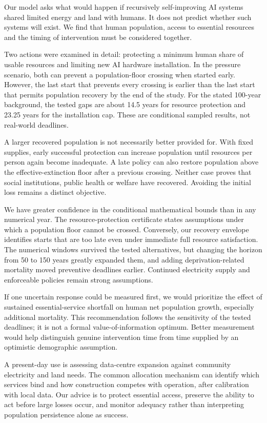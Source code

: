 \documentclass[12pt,a4paper]{article}
\theoremstyle{remark}
\begin{document}
Our model asks what would happen if recursively self-improving AI systems shared limited energy and land with humans. It does not predict whether such systems will exist. We find that human population, access to essential resources and the timing of intervention must be considered together.

Two actions were examined in detail: protecting a minimum human share of usable resources and limiting new AI hardware installation. In the pressure scenario, both can prevent a population-floor crossing when started early. However, the last start that prevents every crossing is earlier than the last start that permits population recovery by the end of the study. For the stated 100-year background, the tested gaps are about 14.5 years for resource protection and 23.25 years for the installation cap. These are conditional sampled results, not real-world deadlines.

A larger recovered population is not necessarily better provided for. With fixed supplies, early successful protection can increase population until resources per person again become inadequate. A late policy can also restore population above the effective-extinction floor after a previous crossing. Neither case proves that social institutions, public health or welfare have recovered. Avoiding the initial loss remains a distinct objective.

We have greater confidence in the conditional mathematical bounds than in any numerical year. The resource-protection certificate states assumptions under which a population floor cannot be crossed. Conversely, our recovery envelope identifies starts that are too late even under immediate full resource satisfaction. The numerical windows survived the tested alternatives, but changing the horizon from 50 to 150 years greatly expanded them, and adding deprivation-related mortality moved preventive deadlines earlier. Continued electricity supply and enforceable policies remain strong assumptions.

If one uncertain response could be measured first, we would prioritize the effect of sustained essential-service shortfall on human net population growth, especially additional mortality. This recommendation follows the sensitivity of the tested deadlines; it is not a formal value-of-information optimum. Better measurement would help distinguish genuine intervention time from time supplied by an optimistic demographic assumption.

A present-day use is assessing data-centre expansion against community electricity and land needs. The common allocation mechanism can identify which services bind and how construction competes with operation, after calibration with local data. Our advice is to protect essential access, preserve the ability to act before large losses occur, and monitor adequacy rather than interpreting population persistence alone as success.
\end{document}
